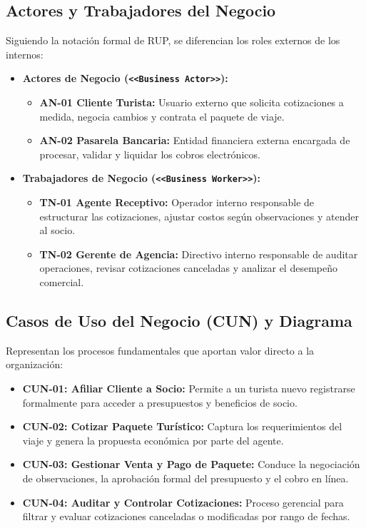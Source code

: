 \subsection{Actores y Trabajadores del Negocio}
Siguiendo la notación formal de RUP, se diferencian los roles externos de los internos:
\begin{itemize}
    \item \textbf{Actores de Negocio (\texttt{<<Business Actor>>}):} 
    \begin{itemize}[noitemsep] 
        \item \textbf{AN-01 Cliente Turista:} Usuario externo que solicita cotizaciones a medida, negocia cambios y contrata el paquete de viaje.
        \item \textbf{AN-02 Pasarela Bancaria:} Entidad financiera externa encargada de procesar, validar y liquidar los cobros electrónicos.
    \end{itemize}
    \item \textbf{Trabajadores de Negocio (\texttt{<<Business Worker>>}):}
    \begin{itemize}[noitemsep]
        \item \textbf{TN-01 Agente Receptivo:} Operador interno responsable de estructurar las cotizaciones, ajustar costos según observaciones y atender al socio.
        \item \textbf{TN-02 Gerente de Agencia:} Directivo interno responsable de auditar operaciones, revisar cotizaciones canceladas y analizar el desempeño comercial.
    \end{itemize}
\end{itemize}

\subsection{Casos de Uso del Negocio (CUN) y Diagrama}
Representan los procesos fundamentales que aportan valor directo a la organización:

\begin{itemize}[noitemsep]
    \item \textbf{CUN-01: Afiliar Cliente a Socio:} Permite a un turista nuevo registrarse formalmente para acceder a presupuestos y beneficios de socio.
    \item \textbf{CUN-02: Cotizar Paquete Turístico:} Captura los requerimientos del viaje y genera la propuesta económica por parte del agente.
    \item \textbf{CUN-03: Gestionar Venta y Pago de Paquete:} Conduce la negociación de observaciones, la aprobación formal del presupuesto y el cobro en línea.
    \item \textbf{CUN-04: Auditar y Controlar Cotizaciones:} Proceso gerencial para filtrar y evaluar cotizaciones canceladas o modificadas por rango de fechas.
\end{itemize}

